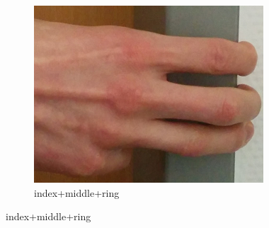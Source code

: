 \documentclass[journal]{IEEEtran}
\begin{document}
\begin{figure}[t!]
\begin{subfigure}{0.25\textwidth}
        \includegraphics[width=.8\linewidth]{img/index+middle+ring}
        \caption{index+middle+ring}
    \end{subfigure}%
    

\end{figure}
\end{document}

